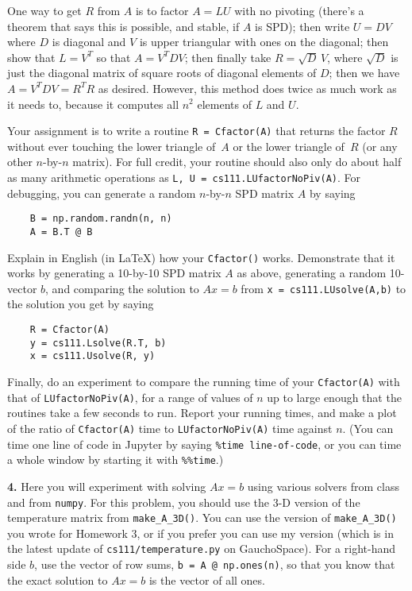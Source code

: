 \documentclass[11pt]{article}
\begin{document}
One way to get $R$ from $A$ is to factor $A=LU$ with no pivoting 
(there's a theorem that says this is possible, and stable, if $A$ is SPD);
then write $U = DV$ where $D$ is diagonal and $V$ is upper triangular with
ones on the diagonal; then show that $L=V^T$ so that $A=V^TDV$; 
then finally take $R=\sqrt D\, V$, where $\sqrt D$ is just the diagonal matrix
of square roots of diagonal elements of $D$; 
then we have $A=V^TDV=R^TR$ as desired.
However, this method does twice as much work as it needs to, 
because it computes all $n^2$ elements of $L$ and $U$.

Your assignment is to write a routine {\tt R = Cfactor(A)} that returns the 
factor $R$ without ever touching the lower triangle of~$A$ or the lower
triangle of~$R$ (or any other $n$-by-$n$ matrix).
For full credit, your routine should also only do about half as many
arithmetic operations as {\tt L, U = cs111.LUfactorNoPiv(A)}.
For debugging, you can generate a random $n$-by-$n$ SPD matrix $A$ by saying
\begin{verbatim}
    B = np.random.randn(n, n)
    A = B.T @ B
\end{verbatim}
Explain in English (in LaTeX) how your {\tt Cfactor()} works.
Demonstrate that it works by generating a 10-by-10 SPD matrix $A$ as above,
generating a random 10-vector $b$, and comparing the solution to $Ax=b$
from {\tt x = cs111.LUsolve(A,b)} to the solution you get by saying
\begin{verbatim}
    R = Cfactor(A)
    y = cs111.Lsolve(R.T, b)
    x = cs111.Usolve(R, y)
\end{verbatim}
Finally, do an experiment to compare the running time of your {\tt Cfactor(A)}
with that of {\tt LUfactorNoPiv(A)}, for a range of values of $n$ up to large
enough that the routines take a few seconds to run. Report your running times,
and make a plot of the ratio of 
{\tt Cfactor(A)} time to {\tt LUfactorNoPiv(A)} time against $n$.
(You can time one line of code in Jupyter by saying {\tt \%time line-of-code}, 
or you can time a whole window by starting it with {\tt \%\%time}.)

\par\bigskip
{\bf 4.} 
Here you will experiment with solving $Ax=b$ using various solvers
from class and from {\tt numpy}.
For this problem, you should use the 3-D version of the temperature matrix
from {\tt make\_A\_3D()}.
You can use the version of {\tt make\_A\_3D()}
you wrote for Homework 3, or if you prefer you can use 
my version (which is in the latest update of {\tt cs111/temperature.py} on GauchoSpace).
For a right-hand side $b$, use the vector of row sums, {\tt b = A @ np.ones(n)},
so that you know that the exact solution to $Ax=b$ is the vector of all ones.
\end{document}

